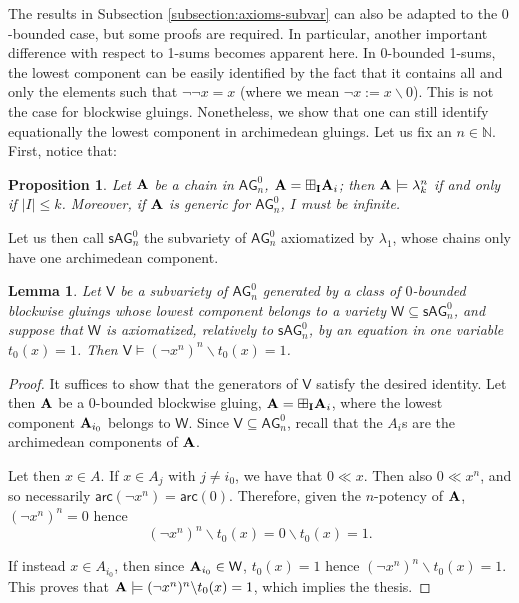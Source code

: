 \documentclass{amsart}
\newtheorem{lemma}[theorem]{Lemma}
\newtheorem{proposition}[theorem]{Proposition}
\theoremstyle{definition}
\numberwithin{equation}{section}
\newcommand{\alg}[1]{{\textbf{\upshape #1}}}  %
\newcommand{\vv}[1]{\mathsf {#1}}
\newcommand{\sse}{\subseteq}
\newcommand{\arc}[1]{{\vv{arc}}(#1)}
\newcommand{\BG}{\vv{AG}}
\newcommand{\ssBG}{\vv{sAG}}
\begin{document}
The results in Subsection \ref{subsection:axioms-subvar} can also be adapted to the $0$-bounded case, but some proofs are required. 
In particular, another important difference with respect to 1-sums becomes apparent here. In $0$-bounded 1-sums, the lowest component can be easily identified by the fact that it contains all and only the elements such that $\neg\neg x = x$ (where we mean $\neg x:= x \backslash 0$). This is not the case for blockwise gluings. Nonetheless, we show that one can still identify equationally the lowest component in archimedean gluings. Let us fix an $n \in \mathbb{N}$. First, notice that:
\begin{proposition}
	Let $\alg A$ be a chain in $\BG_n^0$, $\alg A = \boxplus_{\bf I} \alg A_i$; then $\alg A \models \lambda_k^n$ if and only if $|I| \leq k$. Moreover, if $\alg A$ is generic for  $\BG_n^0$, $I$ must be infinite.
\end{proposition}
Let us then call $\ssBG_n^0$ the subvariety of $\BG^0_n$ axiomatized by $\lambda_1$, whose chains only have one archimedean component.
\begin{lemma}\label{lemma: preservation of the first component}
Let $\vv V$ be a subvariety of $\BG_n^0$ generated by a class of $0$-bounded blockwise gluings whose lowest component belongs to a variety $\vv W \sse \ssBG_n^0$, and suppose that $\vv W$ is axiomatized, relatively to $\ssBG_n^0$, by an equation in one variable $t_0(x)=1$. Then $\vv V \models (\neg x^n)^n \backslash t_0(x) = 1$.
\end{lemma}
\begin{proof}
It suffices to show that the generators of $\vv V$ satisfy the desired identity. Let then $\alg A$ be a $0$-bounded blockwise gluing, $\alg A = \boxplus_{\bf I} \alg A_i$, where the lowest component $\alg A_{i_0}$ belongs to $\vv W$. Since $\vv V \sse \BG_n^0$, recall that the $A_i$s are the archimedean components of $\alg A$.

Let then $x \in A$. If $x \in A_j$ with $j \neq i_0$, we have that $0 \ll x$. Then also $0 \ll x^n$, and so necessarily $\arc {\neg x^n} = \arc 0$. Therefore, given the $n$-potency of $\alg A$, $(\neg x^n)^n = 0$ hence $$(\neg x^n)^n \backslash t_0(x) = 0 \backslash t_0(x) = 1.$$ 

If instead $x \in A_{i_0}$, then since $\alg A_{i_0} \in \vv W$, $t_0(x) = 1$ hence $(\neg x^n)^n \backslash t_0(x) = 1$. This proves that $\alg A \models (\neg x^n)^n \backslash t_0(x) = 1$, which implies the thesis.
\end{proof}
	
\end{document}
